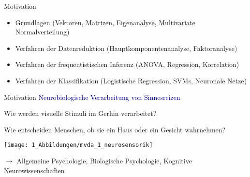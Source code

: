 \documentclass[
  8pt,
  ignorenonframetext,
]{beamer}
\begin{document}
\begin{frame}{Motivation}
\normalsize

\begin{itemize}
\item
  Grundlagen (Vektoren, Matrizen, Eigenanalyse, Multivariate
  Normalverteilung)
\item
  Verfahren der Datenreduktion (Hauptkomponentenanalyse, Faktoranalyse)
\item
  Verfahren der frequentistischen Inferenz (ANOVA, Regression,
  Korrelation)
\item
  Verfahren der Klassifikation (Logistische Regression, SVMs, Neuronale
  Netze)
\end{itemize}
\end{frame}

\begin{frame}{Motivation}
\protect\hypertarget{motivation-1}{}
\textcolor{darkblue}{Neurobiologische Verarbeitung von Sinnesreizen}

\normalsize

Wie werden visuelle Stimuli im Gerhin verarbeitet?

Wie entscheiden Menschen, ob sie ein Haus oder ein Gesicht wahrnehmen?

\begin{center}\texttt{[image: 1\_Abbildungen/mvda\_1\_neurosensorik]} \end{center}

\(\rightarrow\) Allgemeine Psychologie, Biologische Psychologie,
Kognitive Neurowissenschaften
\end{frame}
\end{document}
